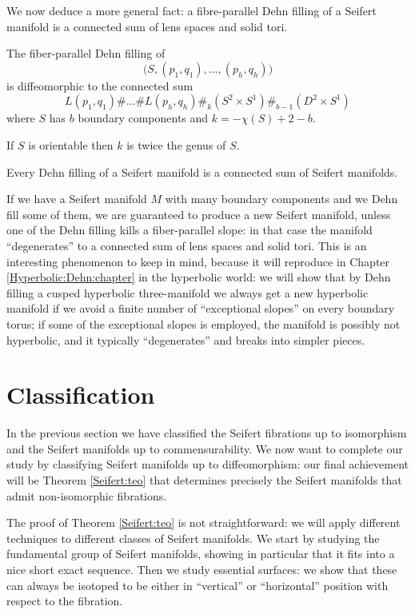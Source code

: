 We now deduce a more general fact: a fibre-parallel Dehn filling of a Seifert manifold is a connected sum of lens spaces and solid tori.

\begin{cor} \label{fiber:parallel:cor}
The fiber-parallel Dehn filling of
$$\big(S, (p_1,q_1), \ldots, (p_h, q_h)\big)$$
is diffeomorphic to the connected sum
$$L(p_1,q_1) \# \ldots \# L(p_h,q_h) \#_k (S^2 \times S^1) \#_{b-1} (D^2 \times S^1)$$
where $S$ has $b$ boundary components and $k=-\chi(S) +2-b$.
\end{cor}
If $S$ is orientable then $k$ is twice the genus of $S$. 

\begin{cor} \label{DF:Seifert:cor}
Every Dehn filling of a Seifert manifold is a connected sum of Seifert manifolds.
\end{cor}

If we have a Seifert manifold $M$ with many boundary components and we Dehn fill some of them, we are guaranteed to produce a new Seifert manifold, unless one of the Dehn filling kills a fiber-parallel slope: in that case the manifold ``degenerates'' to a connected sum of lens spaces and solid tori. This is an interesting phenomenon to keep in mind, because it will reproduce in Chapter \ref{Hyperbolic:Dehn:chapter} in the hyperbolic world: we will show that by Dehn filling a cusped hyperbolic three-manifold we always get a new hyperbolic manifold if we avoid a finite number of ``exceptional slopes'' on every boundary torus; if some of the exceptional slopes is employed, the manifold is possibly not hyperbolic, and it typically ``degenerates'' and breaks into simpler pieces.

\section{Classification}
In the previous section we have classified the Seifert fibrations up to isomorphism and the Seifert manifolds up to commensurability. We now want to complete our study by classifying Seifert manifolds up to diffeomorphism: our final achievement will be Theorem \ref{Seifert:teo} that determines precisely the Seifert manifolds that admit non-isomorphic fibrations.

The proof of Theorem \ref{Seifert:teo} is not straightforward: we will apply different techniques to different classes of Seifert manifolds. We start by studying the fundamental group of Seifert manifolds, showing in particular that it fits into a nice short exact sequence. Then we study essential surfaces: we show that these can always be isotoped to be either in ``vertical'' or ``horizontal'' position with respect to the fibration.


